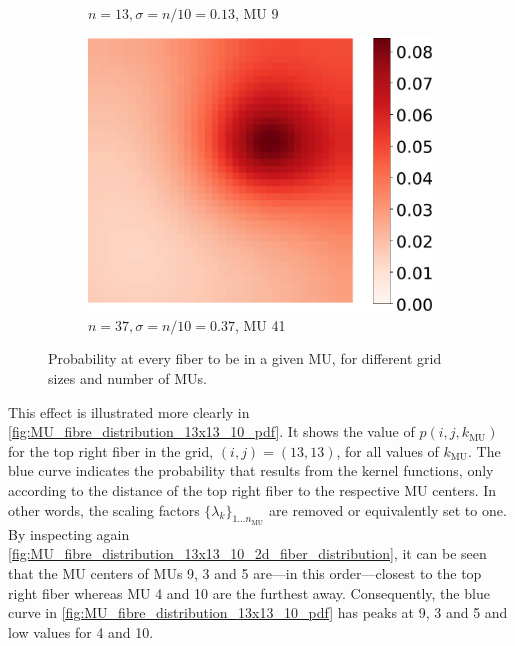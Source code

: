 \begin{figure}
\begin{subfigure}[t]{0.31\textwidth}
    \caption{$n=13, \sigma = n/10 = 0.13$, MU 9}%
    \label{fig:MU_fibre_distribution_13x13_10_fibers_mu9}%
  \end{subfigure}
  \quad
  \begin{subfigure}[t]{0.31\textwidth}%
    \centering%
    \includegraphics[width=\textwidth]{images/motor_unit_assignment/MU_fibre_distribution_37x37_50_fibers_mu41.pdf}%
    \caption{$n=37, \sigma = n/10 = 0.37$, MU 41}%
    \label{fig:MU_fibre_distribution_37x37_50_fibers_mu41}%
  \end{subfigure}
  \caption{Probability at every fiber to be in a given MU, for different grid sizes and number of MUs.}%
  \label{fig:mu_kernel_fkt}%
\end{figure}%

This effect is illustrated more clearly in \cref{fig:MU_fibre_distribution_13x13_10_pdf}. It shows the value of $p(i,j,k_\text{MU})$ for the top right fiber in the grid, $(i,j)=(13,13)$, for all values of $k_\text{MU}$. The blue curve indicates the probability that results from the kernel functions, only according to the distance of the top right fiber to the respective MU centers. In other words, the scaling factors $\{\lambda_k\}_{1\dots n_\text{MU}}$ are removed or equivalently set to one. By inspecting again \cref{fig:MU_fibre_distribution_13x13_10_2d_fiber_distribution}, it can be seen that the MU centers of MUs 9, 3 and 5 are---in this order---closest to the top right fiber whereas MU 4 and 10 are the furthest away. Consequently, the blue curve in \cref{fig:MU_fibre_distribution_13x13_10_pdf} has peaks at 9, 3 and 5 and low values for 4 and 10.

